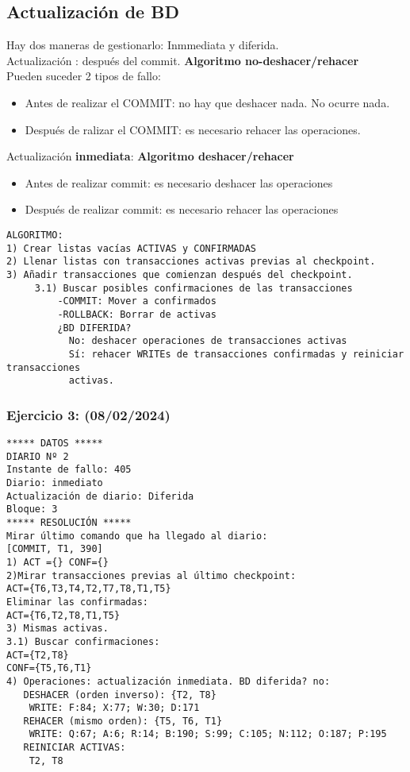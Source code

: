 \documentclass{article}
\begin{document}
\subsection{Actualización de BD}
Hay dos maneras de gestionarlo: Inmmediata y diferida.\\
Actualización : después del commit. \textbf{Algoritmo no-deshacer/rehacer}\\
Pueden suceder 2 tipos de fallo:
\begin{itemize}
	\item Antes de realizar el COMMIT: no hay que deshacer nada. No ocurre nada.
	\item Después de ralizar el COMMIT: es necesario rehacer las operaciones.
\end{itemize}
Actualización \textbf{inmediata}:  \textbf{Algoritmo deshacer/rehacer}
\begin{itemize}
	\item Antes de realizar commit: es necesario deshacer las operaciones
	\item Después de realizar commit: es necesario rehacer las operaciones
\end{itemize}
\begin{verbatim}
ALGORITMO:
1) Crear listas vacías ACTIVAS y CONFIRMADAS
2) Llenar listas con transacciones activas previas al checkpoint. 
3) Añadir transacciones que comienzan después del checkpoint.
     3.1) Buscar posibles confirmaciones de las transacciones
         -COMMIT: Mover a confirmados
         -ROLLBACK: Borrar de activas
         ¿BD DIFERIDA?
           No: deshacer operaciones de transacciones activas
           Sí: rehacer WRITEs de transacciones confirmadas y reiniciar transacciones
           activas.
\end{verbatim}

\subsubsection{Ejercicio 3: (08/02/2024)}
\begin{verbatim}
***** DATOS *****
DIARIO Nº 2
Instante de fallo: 405
Diario: inmediato
Actualización de diario: Diferida
Bloque: 3
***** RESOLUCIÓN *****
Mirar último comando que ha llegado al diario:
[COMMIT, T1, 390]
1) ACT ={} CONF={}
2)Mirar transacciones previas al último checkpoint:
ACT={T6,T3,T4,T2,T7,T8,T1,T5}
Eliminar las confirmadas:
ACT={T6,T2,T8,T1,T5}
3) Mismas activas.
3.1) Buscar confirmaciones: 
ACT={T2,T8}
CONF={T5,T6,T1}
4) Operaciones: actualización inmediata. BD diferida? no:
   DESHACER (orden inverso): {T2, T8}
    WRITE: F:84; X:77; W:30; D:171
   REHACER (mismo orden): {T5, T6, T1}
    WRITE: Q:67; A:6; R:14; B:190; S:99; C:105; N:112; O:187; P:195
   REINICIAR ACTIVAS:
    T2, T8
\end{verbatim}
\end{document}
